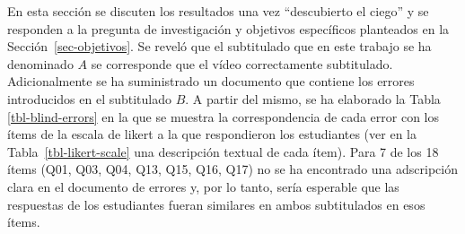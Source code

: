 \documentclass[
  12pt,
  a4paper,
  extrafontsizes,
  onecolumn,
  openright,
  table]{memoir}
\begin{document}
\scriptsize

\normalsize

En esta sección se discuten los resultados una vez \enquote{descubierto
el ciego} y se responden a la pregunta de investigación y objetivos
específicos planteados en la Sección~\ref{sec-objetivos}. Se reveló que
el subtitulado que en este trabajo se ha denominado \(A\) se corresponde
que el vídeo correctamente subtitulado. Adicionalmente se ha
suministrado un documento que contiene los errores introducidos en el
subtitulado \(B\). A partir del mismo, se ha elaborado la Tabla
\ref{tbl-blind-errors} en la que se muestra la correspondencia de cada
error con los ítems de la \gls{escala de likert} a la que respondieron
los estudiantes (ver en la Tabla~\ref{tbl-likert-scale} una descripción
textual de cada ítem). Para 7 de los 18 ítems (Q01, Q03, Q04, Q13, Q15,
Q16, Q17) no se ha encontrado una adscripción clara en el documento de
errores y, por lo tanto, sería esperable que las respuestas de los
estudiantes fueran similares en ambos subtitulados en esos ítems.
\end{document}
